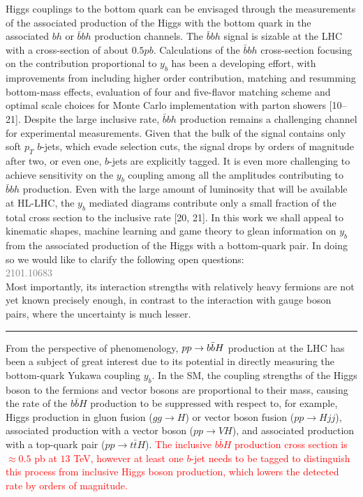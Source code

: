 \documentclass[main.tex]{subfiles}
\begin{document}
\begin{enumerate}
Higgs couplings to the bottom quark can be envisaged through the measurements of the
associated production of the Higgs with the bottom quark in the associated $bh$ or $\bar{b}bh$
production channels.
The $\bar{b}bh$ signal is sizable at the LHC with a cross-section of about $0.5 pb$. Calculations of the $\bar{b}bh$ cross-section focusing on the contribution proportional to $y_b$ has been a
developing effort, with improvements from including higher order contribution, matching
and resumming bottom-mass effects, evaluation of four and five-flavor matching scheme
and optimal scale choices for Monte Carlo implementation with parton showers [10–21].
Despite the large inclusive rate, $\bar{b}bh$ production remains a challenging channel for experimental measurements. Given that the bulk of the signal contains only soft $p_T$ $b$-jets, which
evade selection cuts, the signal drops by orders of magnitude after two, or even one, $b$-jets
are explicitly tagged. It is even more challenging to achieve sensitivity on the $y_b$ coupling
among all the amplitudes contributing to $\bar{b}bh$ production. Even with the large amount of
luminosity that will be available at HL-LHC, the $y_b$ mediated diagrams contribute only a
small fraction of the total cross section to the inclusive rate [20, 21].
In this work we shall appeal to kinematic shapes, machine learning and game theory to
glean information on $y_b$ from the associated production of the Higgs with a bottom-quark
pair. In doing so we would like to clarify the following open questions:
\\
\textcolor{gray}{2101.10683}
\\
Most importantly, its interaction strengths with relatively
heavy fermions are not yet known precisely enough, in contrast to the interaction
with gauge boson pairs, where the uncertainty is much lesser. \\
\hrule
From the perspective of phenomenology, $pp \rightarrow b\bar{b}H$ production at the LHC has been a subject of great interest due to its
potential in directly measuring the bottom-quark Yukawa coupling $y_b$.
In the SM, the coupling strengths of the Higgs boson to the fermions and vector bosons are proportional to their mass, causing the rate of the $b\bar{b}H$ production to be suppressed with respect to, for example,
Higgs production in gluon fusion ($gg\to H$) or vector boson fusion ($pp\to Hjj$), associated
production with a vector boson ($pp\to VH$), and associated production with a top-quark pair ($pp\to
t\bar{t}H$). 
\textcolor{red}{The inclusive $b \bar{b} H$ production cross section is $\approx0.5$ pb at $13$ TeV, however at least one $b$-jet needs to be tagged to distinguish this process from inclusive Higgs boson production, which lowers the detected rate by orders of magnitude.}


\end{enumerate}
\end{document}
